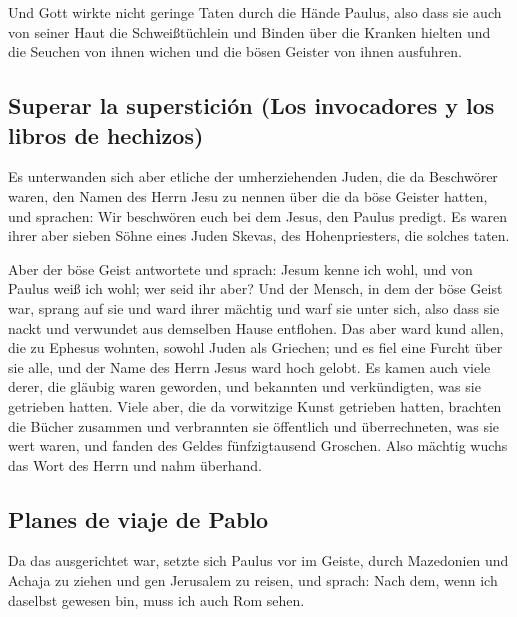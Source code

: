  Und Gott wirkte nicht geringe Taten durch die Hände
Paulus,  also dass sie auch von seiner Haut die
Schweißtüchlein und Binden über die Kranken hielten und die Seuchen von
ihnen wichen und die bösen Geister von ihnen ausfuhren.

\hypertarget{superar-la-supersticiuxf3n-los-invocadores-y-los-libros-de-hechizos}{%
\subsection{Superar la superstición (Los invocadores y los libros de
hechizos)}\label{superar-la-supersticiuxf3n-los-invocadores-y-los-libros-de-hechizos}}

 Es unterwanden sich aber etliche der umherziehenden
Juden, die da Beschwörer waren, den Namen des Herrn Jesu zu nennen über
die da böse Geister hatten, und sprachen: Wir beschwören euch bei dem
Jesus, den Paulus predigt.  Es waren ihrer aber sieben
Söhne eines Juden Skevas, des Hohenpriesters, die solches taten.

 Aber der böse Geist antwortete und sprach: Jesum kenne
ich wohl, und von Paulus weiß ich wohl; wer seid ihr aber?
 Und der Mensch, in dem der böse Geist war, sprang auf
sie und ward ihrer mächtig und warf sie unter sich, also dass sie nackt
und verwundet aus demselben Hause entflohen.  Das aber
ward kund allen, die zu Ephesus wohnten, sowohl Juden als Griechen; und
es fiel eine Furcht über sie alle, und der Name des Herrn Jesus ward
hoch gelobt.  Es kamen auch viele derer, die gläubig
waren geworden, und bekannten und verkündigten, was sie getrieben
hatten.  Viele aber, die da vorwitzige Kunst getrieben
hatten, brachten die Bücher zusammen und verbrannten sie öffentlich und
überrechneten, was sie wert waren, und fanden des Geldes fünfzigtausend
Groschen.  Also mächtig wuchs das Wort des Herrn und nahm
überhand.

\hypertarget{planes-de-viaje-de-pablo}{%
\subsection{Planes de viaje de Pablo}\label{planes-de-viaje-de-pablo}}

 Da das ausgerichtet war, setzte sich Paulus vor im
Geiste, durch Mazedonien und Achaja zu ziehen und gen Jerusalem zu
reisen, und sprach: Nach dem, wenn ich daselbst gewesen bin, muss ich
auch Rom sehen.

